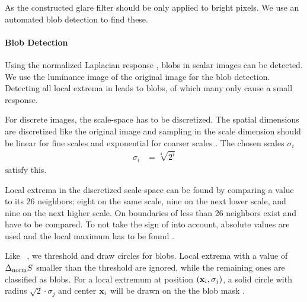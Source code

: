 As the constructed glare filter should be only applied to bright pixels.
We use an automated blob detection to find these.

\paragraph{Blob Detection}
Using the normalized Laplacian response \normlaplacescalespace{}, blobs in scalar images can be detected.
We use the luminance image \luminance{} of the original image \image{} for the blob detection.
Detecting all local extrema in \normlaplacescalespace{} leads to blobs, of which many only cause a small response.

For discrete images, the scale\hyp{}space \scalespace{} has to be discretized.
The spatial dimensions are discretized like the original image and sampling in the scale dimension should be linear for fine scales and exponential for coarser scales \cite[see][Footnote 2]{Lindeberg1998}.
The chosen scales $\sigma_i$
\begin{align}
	\sigma_i &= \sqrt[4]{2^i}
\end{align} 
satisfy this.
%
%
%
%

Local extrema in the discretized scale\hyp{}space can be found by comparing a value to its 26 neighbors:
eight on the same scale, nine on the next lower scale, and nine on the next higher scale.
On boundaries of \scalespace{} less than 26 neighbors exist and have to be compared.
To not take the sign of \normlaplacescalespace{} into account, absolute values are used and the local maximum has to be found \cite{Lindeberg1998}.

Like \citeauthor{Lindeberg1998}~\cite{Lindeberg1998}, we threshold and draw circles for blobs.
Local extrema with a value of $\Delta_\text{norm}S{}$ smaller than the threshold are ignored, while the remaining ones are classified as blobs.
For a local extremum at position $(\mathbf{x}_i, \sigma_j)$, a solid circle with radius $\sqrt{2} \cdot \sigma_j$ and center $\mathbf{x}_i$ will be drawn on the the blob mask \blobmask{}.

